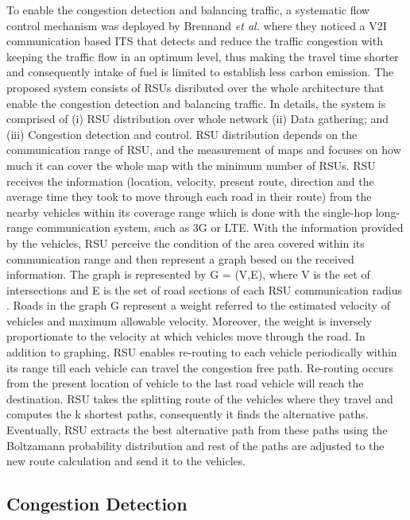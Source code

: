 \documentclass[conference]{IEEEtran}
\begin{document}
To enable the congestion detection and balancing traffic, a systematic flow control mechanism was deployed by Brennand \textit{et al.} \cite{brennand2015intelligent} where they noticed a V2I communication based ITS that detects and reduce the traffic congestion with keeping the traffic flow in an optimum level, thus making the travel time shorter and consequently intake of fuel is limited to establish less carbon emission. The proposed system consists of RSUs disributed over the whole architecture that enable the congestion detection and balancing traffic. In details, the system is comprised of (i) RSU distribution over whole network (ii) Data gathering; and (iii)  Congestion detection and control. RSU distribution depends on the communication range of RSU, and the measurement of maps and focuses on how much it can cover the whole map with the minimum  number of RSUs.  RSU receives the information (location, velocity, present route, direction and the average time they took to move through each road in their route) from the nearby vehicles within its coverage range which is done with the single-hop long-range communication system, such as 3G or LTE. With the information provided by the vehicles, RSU perceive the condition of the area covered within its communication range and then represent a graph besed on the received information. The graph is represented by G = (V,E), where V is the set of intersections and E is the set of road sections of each RSU communication radius \cite{souza:review}. Roads in the graph G represent a weight referred to the estimated velocity of vehicles and maximum allowable velocity. Moreover, the weight is inversely proportionate to the velocity at which vehicles move through the road. In addition to graphing, RSU enables re-routing to each vehicle periodically within its range till each vehicle can travel the congestion free path. Re-routing occurs from the present location of vehicle to the last road vehicle will reach the destination. RSU takes the splitting route of the vehicles where they travel and computes the k shortest paths, consequently it finds the alternative paths. Eventually, RSU extracts the best alternative path from these paths using the Boltzamann  probability distribution \cite{kirkpatrick1983optimization} and rest of the paths are adjusted to the new route calculation and send it to the vehicles.
\subsection{Congestion Detection}
\end{document}
